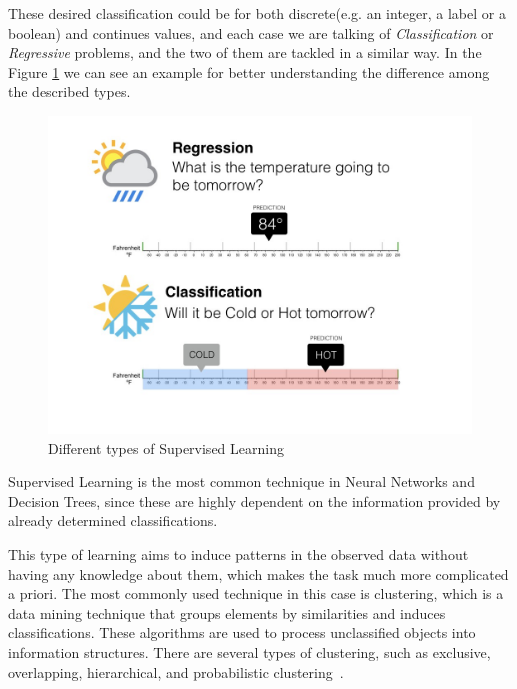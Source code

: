 These desired classification could be for both discrete(e.g. an integer, a label or a boolean) and continues values, and each case we are talking of \textit{Classification} or \textit{Regressive} problems, and the two of them are tackled in a similar way. In the Figure \ref{fig:supervised-learning} we can see an example for better understanding the difference among the described types.

\begin{figure}[!h]
    \centering
    \includegraphics[scale=0.27]{img/state-of-art/supervised-learning.jpeg}
    \caption{Different types of Supervised Learning}
    \label{fig:supervised-learning}
\end{figure}

Supervised Learning is the most common technique in Neural Networks and Decision Trees, since these are highly dependent on the information provided by already determined classifications.

This type of learning aims to induce patterns in the observed data without having any knowledge about them, which makes the task much more complicated a priori. The most commonly used technique in this case is clustering, which is a data mining technique that groups elements by similarities and induces classifications. These algorithms are used to process unclassified objects into information structures. There are several types of clustering, such as exclusive, overlapping, hierarchical, and probabilistic clustering~\cite{WhatisUn52:online}.


